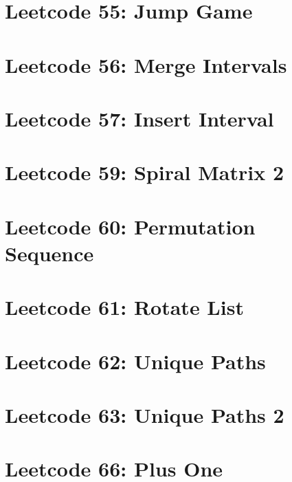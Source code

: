 \documentclass{article}
\begin{document}
\section*{Leetcode 55: Jump Game}

\pagebreak 

\section*{Leetcode 56: Merge Intervals}

\pagebreak 

\section*{Leetcode 57: Insert Interval}

\pagebreak 

\section*{Leetcode 59: Spiral Matrix 2}

\pagebreak 

\section*{Leetcode 60: Permutation Sequence}

\pagebreak 

\section*{Leetcode 61: Rotate List}

\pagebreak 

\section*{Leetcode 62: Unique Paths}

\pagebreak 

\section*{Leetcode 63: Unique Paths 2}

\pagebreak 

\section*{Leetcode 66: Plus One}

\pagebreak 
\end{document}
